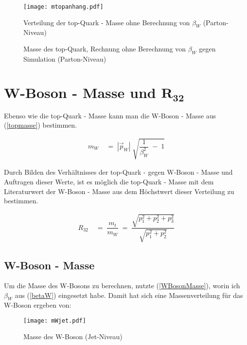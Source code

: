 \documentclass[
a4paper,                                %
twoside,                                %
BCOR1.4cm,                      %
ngerman,                                %
10pt,                           %
headings=normal,                %
headsepline,                    %
clearplainpage, %
final,                                  %
div=14,
parskip=full
]{scrbook}
\begin{document}
\begin{figure}[h]
	\centering
	\texttt{[image: mtopanhang.pdf]}
	\caption{Verteilung der top-Quark - Masse ohne Berechnung von $ \beta_{W} $ (Parton-Niveau)}
\end{figure}

\begin{figure}[h]
    \caption{Masse des top-Quark, Rechnung ohne Berechnung von $ \beta_{W} $ gegen Simulation (Parton-Niveau)}
\end{figure}

\newpage

\section{W-Boson - Masse und $ \boldsymbol{R_{32}} $}

Ebenso wie die top-Quark - Masse kann man die W-Boson - Masse aus (\ref{topmasse}) bestimmen.

\begin{align}
	m_{W}
\;&=\;
	|\vec{p}_{W}|\;\sqrt{\dfrac{1}{\beta_{W}^{2}}\;-\;1}
\label{WBosonMasse}
\end{align}

Durch Bilden des Verh\"altnisses der top-Quark - gegen W-Boson - Masse und Auftragen dieser Werte, ist es m\"oglich die top-Quark - Masse mit dem Literaturwert der W-Boson - Masse aus dem H\"ochstwert dieser Verteilung zu bestimmen.

\begin{align}
	R_{32}
\;&=\;
	\dfrac{m_{t}}{m_{W}}
\;=\;
	\dfrac{\sqrt{p_{1}^{2} + p_{2}^{2} + p_{3}^{2}}}
	{\sqrt{p_{1}^{2} + p_{2}^{2}}}
\label{R32}
\end{align}

\subsection*{W-Boson - Masse}

Um die Masse des W-Bosons zu berechnen, nutzte (\ref{WBosonMasse}), worin ich $ \beta_{W} $ aus (\ref{betaW}) eingesetzt habe. Damit hat sich eine Massenverteilung f\"ur das W-Boson ergeben von:

\begin{figure}[h]
	\centering
    \texttt{[image: mWjet.pdf]}
    \caption{Masse des W-Boson (Jet-Niveau)}
    \label{WBosonmassejethist}
\end{figure}
\end{document}
